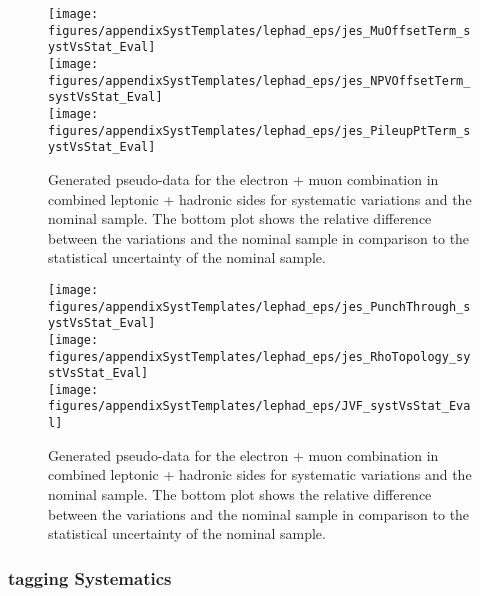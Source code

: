 \begin{figure}[!hb]
\begin{center}
        \texttt{[image: figures/appendixSystTemplates/lephad\_eps/jes\_MuOffsetTerm\_systVsStat\_Eval]}\\
        \texttt{[image: figures/appendixSystTemplates/lephad\_eps/jes\_NPVOffsetTerm\_systVsStat\_Eval]}\\
        \texttt{[image: figures/appendixSystTemplates/lephad\_eps/jes\_PileupPtTerm\_systVsStat\_Eval]}
\caption{Generated pseudo-data for the electron + muon combination in combined leptonic + hadronic sides for systematic variations and the nominal \ttbar sample. The bottom plot shows the relative difference between the variations and the nominal sample in comparison to the statistical uncertainty of the nominal sample.}   
\label{fig:systematicVar_lephad_JES_4_2}
\end{center}
\end{figure}
\begin{figure}[!hb]
\begin{center}
        \texttt{[image: figures/appendixSystTemplates/lephad\_eps/jes\_PunchThrough\_systVsStat\_Eval]}\\
        \texttt{[image: figures/appendixSystTemplates/lephad\_eps/jes\_RhoTopology\_systVsStat\_Eval]} \\
        \texttt{[image: figures/appendixSystTemplates/lephad\_eps/JVF\_systVsStat\_Eval]}

\caption{Generated pseudo-data for the electron + muon combination in combined leptonic + hadronic sides for systematic variations and the nominal \ttbar sample. The bottom plot shows the relative difference between the variations and the nominal sample in comparison to the statistical uncertainty of the nominal sample.}   
\label{fig:systematicVar_lephad_JES_5}
\end{center}
\end{figure}

\clearpage
\subsubsection{\bt tagging Systematics}

